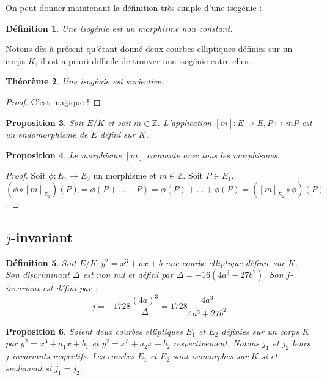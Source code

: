 \documentclass{article}
\theoremstyle{plain}%
\newtheorem{thm}{Théorème}[section]
\newtheorem{prop}[thm]{Proposition}
\newtheorem{deff}[thm]{Définition}
\theoremstyle{definition}%
\newcommand{\Z}{\mathbb{Z}}
\newcommand{\ol}{\overline}
\begin{document}
On peut donner maintenant la définition très simple d'une isogénie :

\begin{deff}
  Une isogénie est un morphisme non constant.
\end{deff}

Notons dès à présent qu'étant donné deux courbes elliptiques définies sur un corps $K$, il est a priori difficile de trouver une isogénie entre elles.

\begin{thm}
  Une isogénie est surjective.  
\end{thm}

\begin{proof}
  C'est magique !
\end{proof}

\begin{prop}
  Soit $E/K$ et soit $m\in\Z$. L'application $[m] : E \to E, P \mapsto mP$ est un endomorphisme de $E$ défini sur $K$. 
\end{prop}

\begin{prop}
  Le morphisme $[m]$ commute avec tous les morphismes. 
\end{prop}

\begin{proof}
  Soit $\phi : E_1\to E_2$ un morphisme et $m\in\Z$. Soit $P\in E_1$. $(\phi \circ [m]_{E_1})(P) = \phi(P + \ldots + P) = \phi(P) + \ldots + \phi(P) = ([m]_{E_2} \circ \phi)(P)$.
\end{proof}

\subsection{$j$-invariant}

\begin{deff}
  Soit $E/K : y^2 = x^3 + ax + b$ une courbe elliptique définie sur $K$. Son discriminant $\Delta$ est non nul et défini par $\Delta = -16(4a^3 + 27b^2)$. Son $j$-invariant est défini par : $$j = -1728\frac{(4a)^3}{\Delta} = 1728\frac{4a^3}{4a^3 + 27b^2}$$ 
\end{deff}

\begin{prop}
Soient deux courbes elliptiques $E_1$ et $E_2$ définies sur un corps $K$ par $y^2 = x^3 + a_1x+ b_1$ et $y^2 = x^3 + a_2x + b_2$ respectivement. Notons $j_1$ et $j_2$ leurs $j$-invariants respectifs. Les courbes $E_1$ et $E_2$ sont isomorphes sur $\ol K$ si et seulement si $j_1 = j_2$.
\end{prop}
\end{document}
